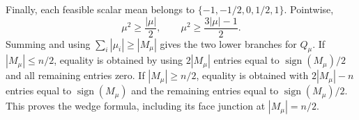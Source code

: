 Finally, each feasible scalar mean belongs to \(\{-1,-1/2,0,1/2,1\}\).  Pointwise,
\[
 \mu^2\geq\frac{|\mu|}{2},
 \qquad
 \mu^2\geq\frac{3|\mu|-1}{2}.
\]
Summing and using \(\sum_i|\mu_i|\geq|M_\mu|\) gives the two lower branches for \(Q_\mu\).  If \(|M_\mu|\leq n/2\), equality is obtained by using \(2|M_\mu|\) entries equal to \(\operatorname{sign}(M_\mu)/2\) and all remaining entries zero.  If \(|M_\mu|\geq n/2\), equality is obtained with \(2|M_\mu|-n\) entries equal to \(\operatorname{sign}(M_\mu)\) and the remaining entries equal to \(\operatorname{sign}(M_\mu)/2\).  This proves the wedge formula, including its face junction at \(|M_\mu|=n/2\).